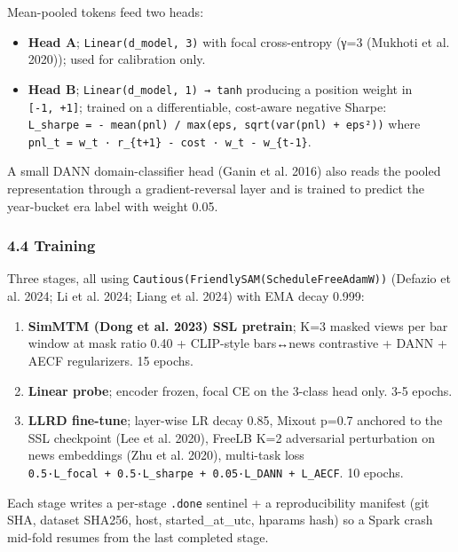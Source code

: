 \documentclass[
]{article}
\providecommand{\tightlist}{%
  \setlength{\itemsep}{0pt}\setlength{\parskip}{0pt}}
\begin{document}
Mean-pooled tokens feed two heads:

\begin{itemize}
\tightlist
\item
  \textbf{Head A}; \texttt{Linear(d\_model,\ 3)} with focal
  cross-entropy (γ=3 (Mukhoti et al. 2020)); used for calibration only.
\item
  \textbf{Head B}; \texttt{Linear(d\_model,\ 1)\ →\ tanh} producing a
  position weight in \texttt{{[}-1,\ +1{]}}; trained on a
  differentiable, cost-aware negative Sharpe:
  \texttt{L\_sharpe\ =\ -\ mean(pnl)\ /\ max(eps,\ sqrt(var(pnl)\ +\ eps²))}
  where
  \texttt{pnl\_t\ =\ w\_t\ ·\ r\_\{t+1\}\ -\ cost\ ·\ \textbar{}w\_t\ -\ w\_\{t-1\}\textbar{}}.
\end{itemize}

A small DANN domain-classifier head ({Ganin et al.} 2016) also reads the
pooled representation through a gradient-reversal layer and is trained
to predict the year-bucket era label with weight 0.05.

\subsubsection{4.4 Training}\label{training}

Three stages, all using
\texttt{Cautious(FriendlySAM(ScheduleFreeAdamW))} ({Defazio et al.}
2024; {Li et al.} 2024; {Liang et al.} 2024) with EMA decay 0.999:

\begin{enumerate}
\def\labelenumi{\arabic{enumi}.}
\tightlist
\item
  \textbf{SimMTM ({Dong et al.} 2023) SSL pretrain}; K=3 masked views
  per bar window at mask ratio 0.40 + CLIP-style bars↔news contrastive +
  DANN + AECF regularizers. 15 epochs.
\item
  \textbf{Linear probe}; encoder frozen, focal CE on the 3-class head
  only. 3-5 epochs.
\item
  \textbf{LLRD fine-tune}; layer-wise LR decay 0.85, Mixout p=0.7
  anchored to the SSL checkpoint (Lee et al. 2020), FreeLB K=2
  adversarial perturbation on news embeddings (Zhu et al. 2020),
  multi-task loss
  \texttt{0.5·L\_focal\ +\ 0.5·L\_sharpe\ +\ 0.05·L\_DANN\ +\ L\_AECF}.
  10 epochs.
\end{enumerate}

Each stage writes a per-stage \texttt{.done} sentinel + a
reproducibility manifest (git SHA, dataset SHA256, host,
started\_at\_utc, hparams hash) so a Spark crash mid-fold resumes from
the last completed stage.
\end{document}
